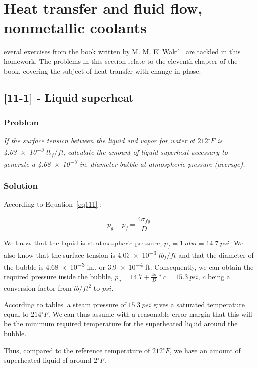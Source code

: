 %
%
\let\textcircled=\pgftextcircled
\chapter{Heat transfer and fluid flow, nonmetallic coolants}
\label{chap:intro}

everal exercises from the book written by M. M. El Wakil~\cite{book01} are tackled in this homework. The problems in this section relate to the eleventh chapter of the book, covering the subject of heat transfer with change in phase.

\section{[11-1] - Liquid superheat}
\label{prob101}


\subsection{Problem}
\textit{If the surface tension between the liquid and vapor for water at $212{}^\circ F$ is \num{4.03e-3} $lb_f/ft$, calculate the amount of liquid superheat necessary to generate a \num{4.68e-3} in. diameter bubble at atmospheric pressure (average).}

\subsection{Solution}


According to Equation~\ref{eq111} :

\begin{equation}\label{eq111}
p_g - p_f = \frac{4\sigma_{fg}}{D}
\end{equation}

We know that the liquid is at atmospheric pressure, $p_f = 1\ atm = 14.7\ psi$. We also know that the surface tension is \num{4.03e-3} $lb_f/ft$ and that the diameter of the bubble is \num{4.68e-3} in., or \num{3.9e-4} ft. Consequently, we can obtain the required pressure inside the bubble, $p_g = 14.7 + \frac{4\sigma}{D} * c = 15.3\ psi$, $c$ being a conversion factor from $lb/ft^2$ to $psi$.


According to tables, a steam pressure of $15.3\ psi$ gives a saturated temperature equal to $214{}^\circ F$. We can thus assume with a reasonable error margin that this will be the minimum required temperature for the superheated liquid around the bubble.

Thus, compared to the reference temperature of $212{}^\circ F$, we have an amount of superheated liquid of around $2{}^\circ F$.



